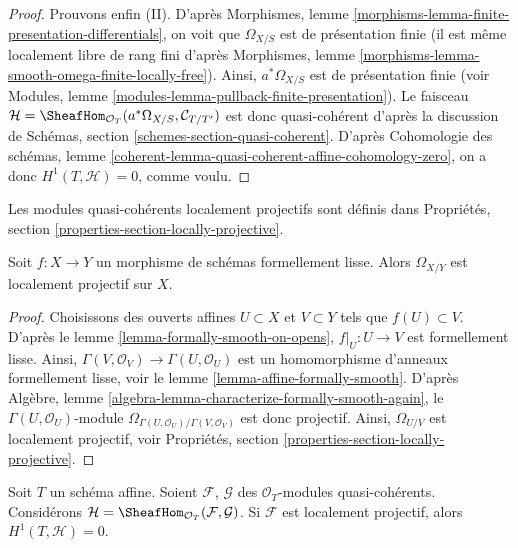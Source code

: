 \begin{proof}
\medskip\noindent
Prouvons enfin (II).
D'après Morphismes, lemme \ref{morphisms-lemma-finite-presentation-differentials},
on voit que $\Omega_{X/S}$ est de présentation finie
(il est même localement libre de rang fini d'après
Morphismes, lemme \ref{morphisms-lemma-smooth-omega-finite-locally-free}).
Ainsi, $a^*\Omega_{X/S}$ est de présentation finie (voir
Modules, lemme \ref{modules-lemma-pullback-finite-presentation}).
Le faisceau
$\mathcal{H} =
\SheafHom_{\mathcal{O}_T}(a^*\Omega_{X/S}, \mathcal{C}_{T/T'})$
est donc quasi-cohérent d'après la discussion de
Schémas, section \ref{schemes-section-quasi-coherent}.
D'après Cohomologie des schémas, lemme
\ref{coherent-lemma-quasi-coherent-affine-cohomology-zero},
on a donc $H^1(T, \mathcal{H}) = 0$, comme voulu.
\end{proof}

\noindent
Les modules quasi-cohérents localement projectifs sont définis dans
Propriétés, section \ref{properties-section-locally-projective}.

\begin{lemma}
\label{lemma-formally-smooth-sheaf-differentials}
Soit $f : X \to Y$ un morphisme de schémas formellement lisse.
Alors $\Omega_{X/Y}$ est localement projectif sur $X$.
\end{lemma}

\begin{proof}
Choisissons des ouverts affines $U \subset X$ et $V \subset Y$ tels que
$f(U) \subset V$. D'après
le lemme \ref{lemma-formally-smooth-on-opens},
$f|_U : U \to V$ est formellement lisse. Ainsi,
$\Gamma(V, \mathcal{O}_V) \to \Gamma(U, \mathcal{O}_U)$ est
un homomorphisme d'anneaux formellement lisse, voir
le lemme \ref{lemma-affine-formally-smooth}.
D'après
Algèbre, lemme \ref{algebra-lemma-characterize-formally-smooth-again},
le $\Gamma(U, \mathcal{O}_U)$-module
$\Omega_{\Gamma(U, \mathcal{O}_U)/\Gamma(V, \mathcal{O}_V)}$
est donc projectif. Ainsi, $\Omega_{U/V}$ est localement projectif, voir
Propriétés, section \ref{properties-section-locally-projective}.
\end{proof}

\begin{lemma}
\label{lemma-h1-is-zero}
Soit $T$ un schéma affine. Soient $\mathcal{F}$, $\mathcal{G}$ des
$\mathcal{O}_T$-modules quasi-cohérents. Considérons
$\mathcal{H} = \SheafHom_{\mathcal{O}_T}(\mathcal{F}, \mathcal{G})$.
Si $\mathcal{F}$ est localement projectif, alors $H^1(T, \mathcal{H}) = 0$.
\end{lemma}

